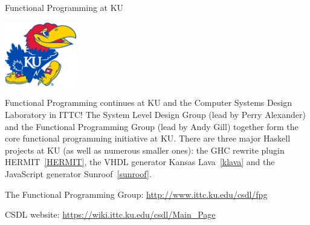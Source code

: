 \begin{hcarentry}[section]{Functional Programming at KU}
\label{ukansas}
\makeheader

\begin{center}
\includegraphics[width=0.235\textwidth]{html/jh2.jpg}
\end{center}

Functional Programming continues at KU and
the Computer Systems Design Laboratory in ITTC!
The System Level Design Group (lead by Perry Alexander)
and the Functional Programming Group (lead by Andy Gill)
together form the core functional programming initiative at KU.
There are three major Haskell projects at KU (as
well as numerous smaller ones):
the GHC rewrite plugin HERMIT~\cref{HERMIT},
the VHDL generator Kansas Lava~\cref{klava} and
the JavaScript generator Sunroof~\cref{sunroof}.

\FurtherReading
\begin{compactitem}
\item   The Functional Programming Group:
    \url{http://www.ittc.ku.edu/csdl/fpg}
\item
  CSDL website: \url{https://wiki.ittc.ku.edu/csdl/Main\_Page}
\end{compactitem}
\end{hcarentry}
